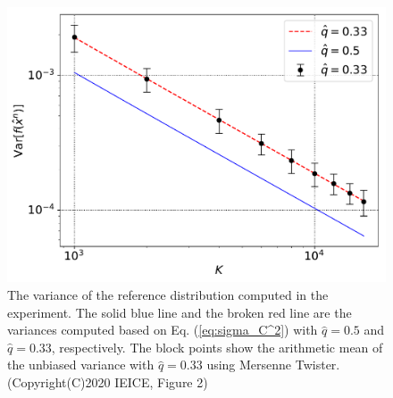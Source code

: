 \documentclass[dvipdfmx,english]{ampmt} %
\begin{document}
\begin{figure}[htbp]
  \centering
    \includegraphics[width=0.7\linewidth]{./figure/fig4.pdf}
    \caption{The variance of the reference distribution computed in the experiment. The solid blue line and the broken red line are the variances computed based on Eq. (\ref{eq:sigma_C^2}) with $\hat{q}=0.5$ and $\hat{q}=0.33$, respectively. The block points show the arithmetic mean of the unbiased variance with $\hat{q}=0.33$ using Mersenne Twister. (Copyright(C)2020 IEICE, \cite{hikima2020} Figure 2)}
    \label{fig:2}
\end{figure}
\clearpage
\end{document}
